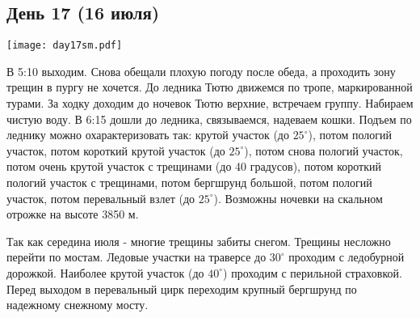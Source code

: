 \graphicspath{{Pictures/Chapter5/Day17}}


\subsection{День 17 (16 июля)}\label{subsec:Day17}
    \parbox[c]{\textwidth}{%
        \texttt{[image: day17sm.pdf]}\label{fig:Day17_map}%
    }
    \vspace{0.8cm}

В 5:10 выходим. Снова обещали плохую погоду после обеда, а проходить зону трещин в пургу не хочется. До ледника Тютю движемся по тропе, маркированной турами. За ходку доходим до ночевок Тютю верхние, встречаем группу. Набираем чистую воду. В 6:15 дошли до ледника, связываемся, надеваем кошки. Подъем по леднику можно охарактеризовать так: крутой участок (до $25^\circ$), потом пологий участок, потом короткий крутой участок (до $25^\circ$), потом снова пологий участок, потом очень крутой участок с трещинами (до 40 градусов), потом короткий  пологий участок с трещинами, потом бергшрунд большой, потом пологий участок, потом перевальный взлет (до $25^\circ$). Возможны ночевки на скальном отрожке на высоте 3850 м.

Так как середина июля - многие трещины забиты снегом. Трещины несложно перейти по
мостам. Ледовые участки на траверсе до $30^\circ$ проходим с ледобурной дорожкой. Наиболее крутой участок (до $40^\circ$) проходим с перильной страховкой. Перед выходом в перевальный цирк переходим крупный бергшрунд по надежному снежному мосту.

